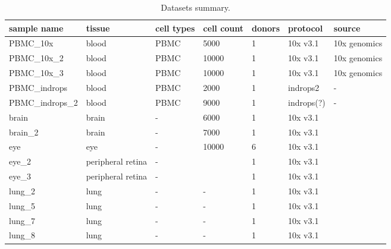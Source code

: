 \begin{table}[htbp]
  \centering
  \begin{tabular}{l|llllll}
    \toprule
    sample name & tissue & cell types & cell count & donors & protocol & source \\
    \midrule
    PBMC\_10x & blood & PBMC & 5000 & 1 & 10x v3.1 & 10x genomics \\
    PBMC\_10x\_2 & blood & PBMC & 10000 & 1 & 10x v3.1 & 10x genomics \\
    PBMC\_10x\_3 & blood & PBMC & 10000 & 1 & 10x v3.1 & 10x genomics \\
    PBMC\_indrops & blood & PBMC & 2000 & 1 & indrops2 & - \\
    PBMC\_indrops\_2 & blood & PBMC & 9000 & 1 & indrops(?) & - \\
    brain & brain & - & 6000 & 1 & 10x v3.1 & \cite{Siletti2023} \\
    brain\_2 & brain & - & 7000 & 1 & 10x v3.1 & \cite{Siletti2023} \\
    eye & eye & - & 10000 & 6 & 10x v3.1 & \cite{Menon2019} \\
    eye\_2 & peripheral retina & - &  & 1 & 10x v3.1 & \cite{Voigt2019} \\
    eye\_3 & peripheral retina & - &  & 1 & 10x v3.1 & \cite{Voigt2019} \\
    lung\_2 & lung & - & - & 1 & 10x v3.1 & \cite{Mould2021} \\
    lung\_5 & lung & - & - & 1 & 10x v3.1 & \cite{Mould2021} \\
    lung\_7 & lung & - & - & 1 & 10x v3.1 & \cite{Mould2021} \\
    lung\_8 & lung & - & - & 1 & 10x v3.1 & \cite{Mould2021} \\
    \bottomrule
  \end{tabular}
  \caption{Datasets summary.}
  \label{tab:datasets}
\end{table}
